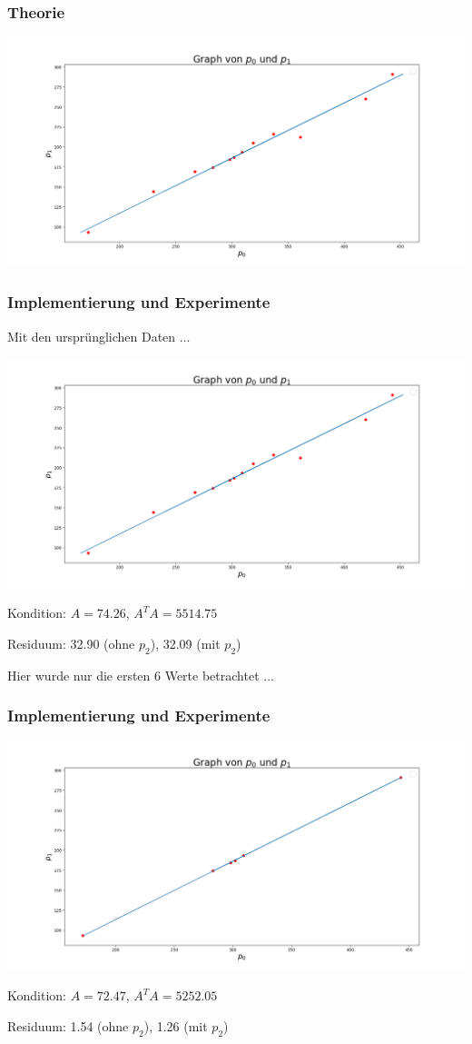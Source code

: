 \documentclass{beamer}
\begin{document}
\begin{frame}
    \frametitle{Theorie}
    \includegraphics[width=\textwidth]{plot.png}
\end{frame}

\begin{frame}
\frametitle{Implementierung und Experimente}

Mit den ursprünglichen Daten ...

\includegraphics[width=\textwidth]{plot.png}

Kondition: $A = 74.26$, $A^T A = 5514.75$

Residuum: 32.90 (ohne $p_2$), 32.09 (mit $p_2$)
\end{frame}

\begin{frame}
Hier wurde nur die ersten 6 Werte betrachtet ...

\frametitle{Implementierung und Experimente}
\includegraphics[width=\textwidth]{plot1.png}

Kondition: $A = 72.47$, $A^T A = 5252.05$

Residuum: 1.54 (ohne $p_2$), 1.26 (mit $p_2$)
\end{frame}
\end{document}
